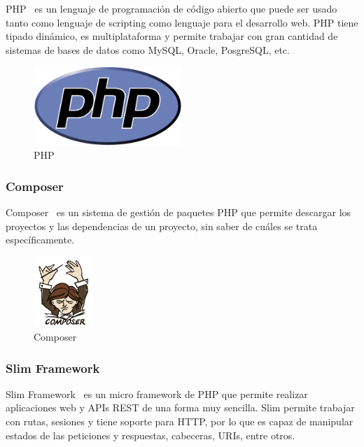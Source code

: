 PHP~\cite{php} es un lenguaje de programación de código abierto que puede ser usado tanto como lenguaje de scripting como lenguaje para el desarrollo web. PHP tiene tipado dinámico, es multiplataforma y permite trabajar con gran cantidad de sistemas de bases de datos como MySQL, Oracle, PosgreSQL, etc.

\begin{figure}[tbh]
\centering
\label{fig:php}
\includegraphics[width=0.5\textwidth]{imagenes/PHP}
\caption{PHP}
\end{figure}

\subsubsection*{Composer}

Composer~\cite{composer} es un sistema de gestión de paquetes PHP que permite descargar los proyectos y las dependencias de un proyecto, sin saber de cuáles se trata específicamente. 

\begin{figure}[tbh]
\centering
\label{fig:composer}
\includegraphics[width=0.2\textwidth]{imagenes/composer}
\caption{Composer}
\end{figure}

\subsubsection*{Slim Framework}

Slim Framework~\cite{slim} es un micro framework de PHP que permite realizar aplicaciones web y APIs REST de una forma muy sencilla. Slim permite trabajar con rutas, sesiones y tiene soporte para HTTP, por lo que es capaz de manipular estados de las peticiones y respuestas, cabeceras, URIs, entre otros. 

